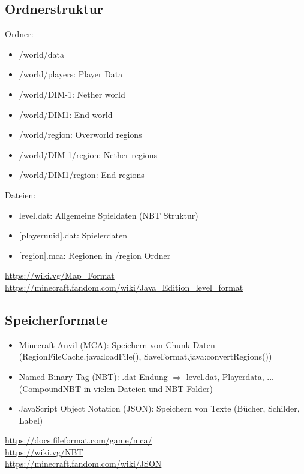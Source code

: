 
\subsection{Ordnerstruktur}
Ordner:
\begin{itemize}
    \item /world/data
    \item /world/players: Player Data
    \item /world/DIM-1: Nether world
    \item /world/DIM1: End world
    \item /world/region: Overworld regions
    \item /world/DIM-1/region: Nether regions
    \item /world/DIM1/region: End regions
\end{itemize}

Dateien:
\begin{itemize}
    \item level.dat: Allgemeine Spieldaten (NBT Struktur)
    \item $[$playeruuid$]$.dat: Spielerdaten
    \item $[$region$]$.mca: Regionen in /region Ordner
\end{itemize}

\url{https://wiki.vg/Map_Format}\\
\url{https://minecraft.fandom.com/wiki/Java_Edition_level_format}

\subsection{Speicherformate}
\begin{itemize}
    \item Minecraft Anvil (MCA): Speichern von Chunk Daten (RegionFileCache.java:loadFile(), SaveFormat.java:convertRegions())
    \item Named Binary Tag (NBT): .dat-Endung $\Rightarrow$ level.dat, Playerdata, ... (CompoundNBT in vielen Dateien und NBT Folder)
    \item JavaScript Object Notation (JSON): Speichern von Texte (Bücher, Schilder, Label)
\end{itemize}

\url{https://docs.fileformat.com/game/mca/}\\
\url{https://wiki.vg/NBT}\\
\url{https://minecraft.fandom.com/wiki/JSON}

